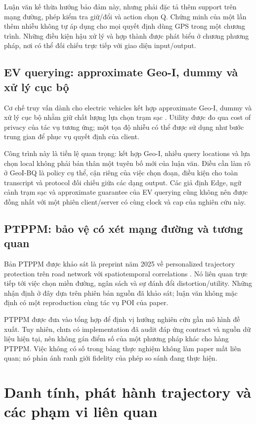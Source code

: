 Luận văn kế thừa hướng bảo đảm này, nhưng phải đặc tả thêm support trên mạng đường, phép kiểm tra
giữ/đổi và action chọn Q. Chứng minh của một lần thêm nhiễu không tự áp dụng cho mọi quyết định dùng
GPS trong một chương trình. Những điều kiện hậu xử lý và hợp thành được phát biểu ở chương phương
pháp, nơi có thể đối chiếu trực tiếp với giao diện input/output.

\subsection{EV querying: approximate Geo-I, dummy và xử lý cục bộ}
Cơ chế truy vấn dành cho electric vehicles kết hợp approximate Geo-I, dummy và xử lý cục bộ nhằm
giữ chất lượng lựa chọn trạm sạc \cite{ev}. Utility được đo qua cost of privacy của tác vụ tương ứng;
một tọa độ nhiễu có thể được sử dụng như bước trung gian để phục vụ quyết định của client.

Công trình này là tiền lệ quan trọng: kết hợp Geo-I, nhiều query locations và lựa chọn local không
phải bản thân một tuyên bố mới của luận văn. Điều cần làm rõ ở GeoI-BQ là policy cụ thể, cận riêng
của việc chọn đoạn, điều kiện cho toàn transcript và protocol đối chiếu giữa các dạng output.
Các giả định Edge, ngữ cảnh trạm sạc và approximate guarantee của EV querying cũng không nên được
đồng nhất với một phiên client/server có cùng clock và cap của nghiên cứu này.

\subsection{PTPPM: bảo vệ có xét mạng đường và tương quan}
Bản PTPPM được khảo sát là preprint năm 2025 về personalized trajectory protection trên road network
với spatiotemporal correlations \cite{ptppm}. Nó liên quan trực tiếp tới việc chọn miền đường,
ngân sách và sự đánh đổi distortion/utility. Những nhận định ở đây dựa trên phiên bản nguồn đã khảo
sát; luận văn không mặc định có một reproduction cùng tác vụ POI của paper.

PTPPM được đưa vào tổng hợp để định vị hướng nghiên cứu gần mô hình đề xuất. Tuy nhiên, chưa có
implementation đã audit đáp ứng contract và nguồn dữ liệu hiện tại, nên không gán điểm số của một
phương pháp khác cho hàng PTPPM. Việc không có số trong bảng thực nghiệm không làm paper mất liên
quan; nó phản ánh ranh giới fidelity của phép so sánh đang thực hiện.

\section{Danh tính, phát hành trajectory và các phạm vi liên quan}
